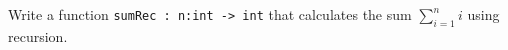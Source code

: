 Write a function \lstinline{sumRec : n:int -> int} that calculates the sum $\sum_{i=1}^ni$ using recursion.
